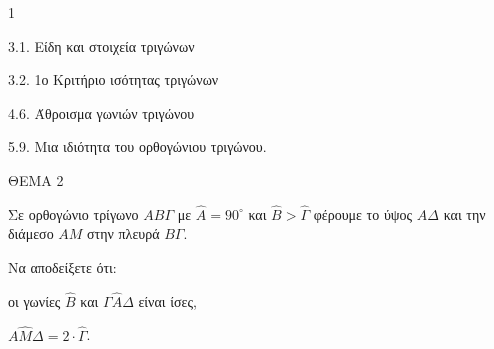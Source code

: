 \begin{ylh}{1}
    \item 3.1. Είδη και στοιχεία τριγώνων
    \item 3.2. 1ο Κριτήριο ισότητας τριγώνων
    \item 4.6. Άθροισμα γωνιών τριγώνου
    \item 5.9. Μια ιδιότητα του ορθογώνιου τριγώνου.
\end{ylh}

ΘΕΜΑ 2

Σε ορθογώνιο τρίγωνο $ΑΒ\Gamma$ με $\widehat{Α} = 90^{\circ}$ και $\widehat{Β} > \widehat{\Gamma}$ φέρουμε το ύψος $Α\Delta$ και την διάμεσο $ΑΜ$ στην πλευρά $Β\Gamma$.

Να αποδείξετε ότι:

\begin{alist}
\item οι γωνίες $\widehat{Β}$ και $\Gamma\widehat{A}\Delta$ είναι ίσες, 
\item $A\widehat{M}\Delta = 2 \cdot \widehat{\Gamma}$. 

\begin{center}
\end{center}
\end{alist}
